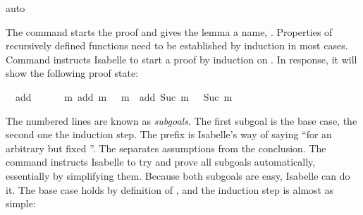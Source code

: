 \begin{isabellebody}
\isamarkupfalse%
{}auto{}\isanewline
{}\isamarkupfalse%
%
\endisatagproof
{\isafoldproof}%
%
\isadelimproof
%
\endisadelimproof
%
\isadelimproof
%
\endisadelimproof
%
\isatagproof
%
\begin{isamarkuptxt}%
The  command starts the proof and gives the lemma
a name, . Properties of recursively defined functions
need to be established by induction in most cases.
Command  instructs Isabelle to
start a proof by induction on . In response, it will show the
following proof state:
\begin{isabelle}%
\ {}{}\ add\ {}\ {}\ {}\ {}\isanewline
\ {}{}\ {}m{}\ add\ m\ {}\ {}\ m\ {}\ add\ {}Suc\ m{}\ {}\ {}\ Suc\ m%
\end{isabelle}
The numbered lines are known as \emph{subgoals}.
The first subgoal is the base case, the second one the induction step.
The prefix  is Isabelle's way of saying ``for an arbitrary but fixed ''. The  separates assumptions from the conclusion.
The command  instructs Isabelle to try
and prove all subgoals automatically, essentially by simplifying them.
Because both subgoals are easy, Isabelle can do it.
The base case  holds by definition of ,
and the induction step is almost as simple:

\end{isamarkuptxt}
\end{isabellebody}
